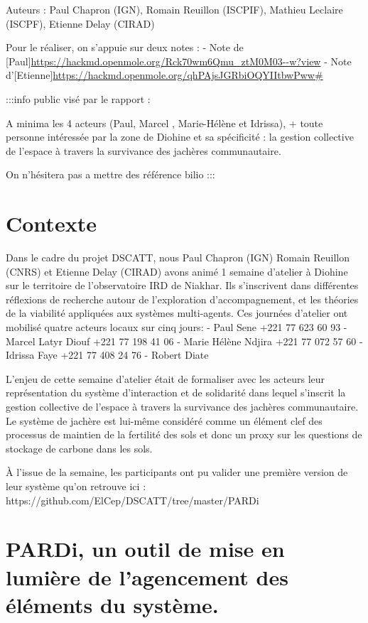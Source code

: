 \newpage



Auteurs : Paul Chapron (IGN), Romain Reuillon (ISCPIF), Mathieu Leclaire (ISCPF), Etienne Delay (CIRAD)

Pour le réaliser, on s'appuie sur deux notes : 
- Note de [Paul]\url{https://hackmd.openmole.org/Rck70wm6Qmu_ztM0M03--w?view}
- Note d'[Etienne]\url{https://hackmd.openmole.org/qhPAjsJGRbiOQYIItbwPww#}


:::info
public visé par le rapport : 

A minima les 4 acteurs (Paul, Marcel ,  Marie-Hélène et Idrissa), + toute personne intéressée par la zone de Diohine et sa spécificité : la gestion collective de l’espace à travers la survivance des jachères communautaire.

On n'hésitera pas a mettre des référence bilio
:::


\section{Contexte}

Dans le cadre du projet DSCATT, nous Paul Chapron (IGN) Romain Reuillon (CNRS) et Etienne Delay (CIRAD) avons animé 1 semaine d'atelier à Diohine sur le territoire de l'observatoire IRD de Niakhar. Ils s'inscrivent dans différentes réflexions de recherche autour de l'exploration d'accompagnement, et les théories de la viabilité appliquées aux systèmes multi-agents.
Ces journées d'atelier ont mobilisé quatre acteurs locaux sur cinq jours: 
- Paul Sene +221 77 623 60 93
- Marcel Latyr Diouf +221 77 198 41 06
- Marie Hélène Ndjira +221 77 072 57 60
- Idrissa Faye +221 77 408 24 76
- Robert Diate 

L'enjeu de cette semaine d'atelier était de formaliser avec les acteurs leur représentation du système d'interaction et de solidarité dans lequel s'inscrit la gestion collective de l'espace à travers la survivance des jachères communautaire. Le système de jachère est lui-même considéré comme un élément clef des processus de maintien de la fertilité des sols et donc un proxy sur les questions de stockage de carbone dans les sols. 

À l'issue de la semaine, les participants ont pu valider une première version de leur système qu'on retrouve ici : https://github.com/ElCep/DSCATT/tree/master/PARDi

\section{PARDi, un outil de mise en lumière de l'agencement des éléments du système.}

